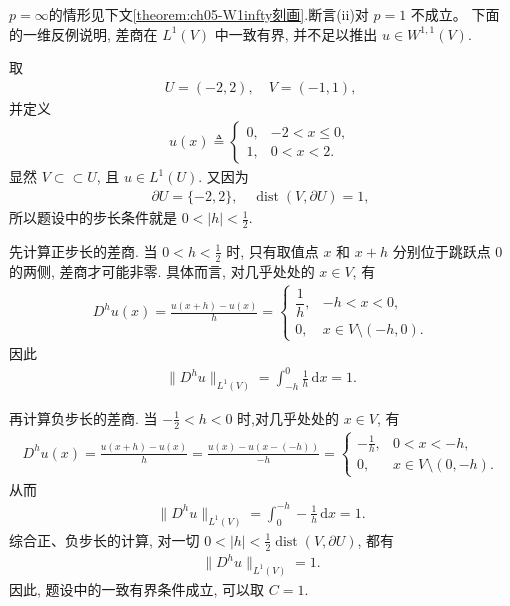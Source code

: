 \documentclass[../../main.tex]{subfiles}
\begin{document}
\begin{remark}
$p=\infty$的情形见下文\cref{theorem:ch05-W1infty刻画}.断言(ii)对 $p=1$ 不成立。
下面的一维反例说明, 差商在 $L^1(V)$ 中一致有界, 并不足以推出 $u\in W^{1,1}(V)$.

取
\begin{align*}
U=(-2,2),\quad V=(-1,1),
\end{align*}
并定义
\begin{align*}
u(x)\triangleq
\begin{cases}
0,&-2<x\leqslant0,\\
1,&0<x<2.
\end{cases}
\end{align*}
显然 $V\subset \subset U$, 且 $u\in L^1(U)$. 又因为
\begin{align*}
\partial U=\{-2,2\},\quad
\operatorname{dist}(V,\partial U)=1,
\end{align*}
所以题设中的步长条件就是
$0<|h|<\frac{1}{2}.$

先计算正步长的差商. 当 $0<h<\frac{1}{2}$ 时, 只有取值点 $x$ 和 $x+h$ 分别位于跳跃点 $0$ 的两侧, 差商才可能非零. 具体而言, 对几乎处处的 $x\in V$, 有
\begin{align*}
D^h u(x)
=
\frac{u(x+h)-u(x)}{h}
=
\begin{cases}
\dfrac{1}{h},&-h<x<0,\\
0,&x\in V\setminus(-h,0).
\end{cases}
\end{align*}
因此
\begin{align*}
\|D^h u\|_{L^1(V)}
=
\int_{-h}^{0}\frac{1}{h}\,\mathrm{d}x
=1.
\end{align*}

再计算负步长的差商. 当 $-\frac{1}{2}<h<0$ 时,对几乎处处的 $x\in V$, 有
\begin{align*}
D^h u(x)
=
\frac{u(x+h)-u(x)}{h}
=
\frac{u(x)-u(x-(-h))}{-h}=
\begin{cases}
-\frac{1}{h},&0<x<-h,\\
0,&x\in V\setminus(0,-h).
\end{cases}
\end{align*}
从而
\begin{align*}
\|D^h u\|_{L^1(V)}
=
\int_0^{-h}-\frac{1}{h}\,\mathrm{d}x
=1.
\end{align*}
综合正、负步长的计算, 对一切
$0<|h|<\frac{1}{2}\operatorname{dist}(V,\partial U)$, 都有
\begin{align*}
\|D^h u\|_{L^1(V)}=1.
\end{align*}
因此, 题设中的一致有界条件成立, 可以取 $C=1$.


\end{remark}
\end{document}
